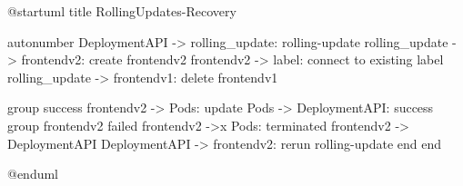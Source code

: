 @startuml
title RollingUpdates-Recovery

autonumber
DeploymentAPI -> rolling_update: rolling-update
rolling_update -> frontendv2: create frontendv2
frontendv2 -> label: connect to existing label
rolling_update -> frontendv1: delete frontendv1

group success
  frontendv2 -> Pods: update
  Pods -> DeploymentAPI: success
  group frontendv2 failed
    frontendv2 ->x Pods: terminated
    frontendv2 -> DeploymentAPI
    DeploymentAPI -> frontendv2: rerun rolling-update
    end
end

@enduml
